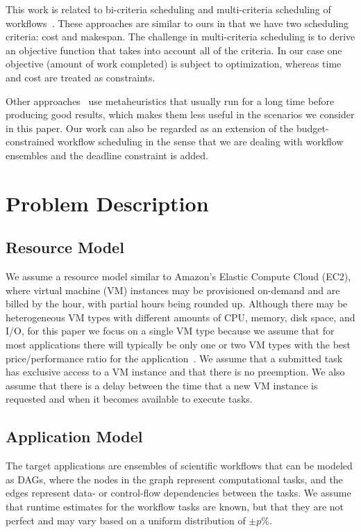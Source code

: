 \documentclass[preprint,5p]{elsarticle}
\begin{document}
This work is related to bi-criteria scheduling and multi-criteria scheduling of
workflows~\cite{Wieczorek2009,Prodan2010,Dongarra2007,Durillo2013}. These approaches are
similar to ours in that we have two scheduling criteria: cost and makespan. The
challenge in multi-criteria scheduling is to derive an objective function that
takes into account all of the criteria. In our case one objective (amount
of work completed) is subject to optimization, whereas time and cost are
treated as constraints. 

Other approaches~\cite{Talukder2009,Pandey2010} use
metaheuristics that usually run for a long time before producing good results,
which makes them less useful in the scenarios we consider in this paper. Our work can also
be regarded as an extension of the budget-constrained workflow scheduling
\cite{Sakellariou2007} in the sense that we are dealing with workflow ensembles
and the deadline constraint is added.

 
\section{Problem Description}
\label{sec:problem}

\subsection{Resource Model}  
We assume a resource model similar to Amazon's Elastic Compute Cloud (EC2),
where virtual machine (VM) instances may be provisioned on-demand and are billed by
the hour, with partial hours being rounded up. Although there may be
heterogeneous VM types with different amounts of CPU, memory, disk space, and
I/O, for this paper we focus on a single VM type because we assume that for most
applications there will typically be only one or two VM types with the best
price/performance ratio for the application~\cite{Juve2009}. We assume that
a submitted task has exclusive access to a VM instance and that there is no
preemption. We also assume that there is a delay between the time that a new VM
instance is requested and when it becomes available to execute tasks.

\subsection{Application Model} 
The target applications are ensembles of
scientific workflows that can be modeled as DAGs, where the nodes in the graph
represent computational tasks, and the edges represent data- or control-flow
dependencies between the tasks. We assume that runtime estimates for the
workflow tasks are known, but that they are not perfect and may vary based on
a uniform distribution of $\pm p\%$.
\end{document}
